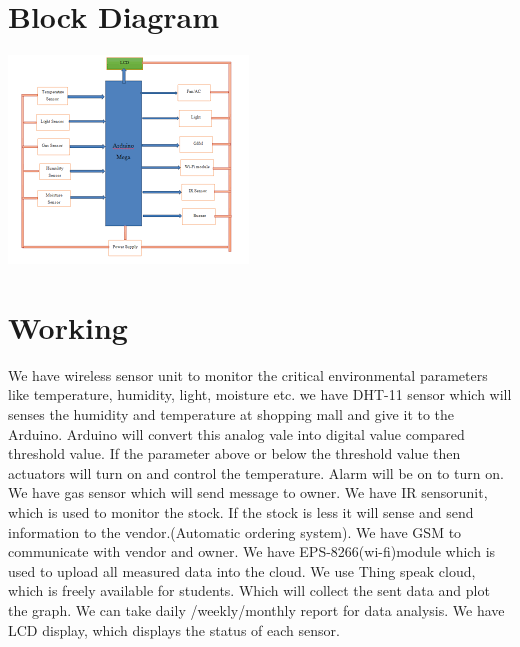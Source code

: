 \documentclass{report}
\begin{document}
\begin{multicols}{1}
    \section*{Block Diagram}
    \includegraphics{images/blockdig.png}\\
    \section*{Working}
    We have wireless sensor unit to monitor the critical environmental parameters like temperature, humidity, light, moisture etc. we have DHT-11 sensor which will senses the humidity and temperature at shopping mall and give it to the Arduino. Arduino will convert this analog vale into digital value compared threshold value. If the parameter above or below the threshold value then actuators will turn on and control the temperature. Alarm will be on to turn on. We have gas sensor which will send message to owner. We have IR sensorunit, which is used to monitor the stock. If the stock is less it will sense and send information to the vendor.(Automatic ordering system). We have GSM to communicate with vendor and owner. We have EPS-8266(wi-fi)module which is used to upload all measured data into the cloud. We use Thing speak cloud, which is freely available for students. Which will collect the sent data and plot the graph. We can take daily /weekly/monthly report for data analysis. We have LCD display, which displays the status of each sensor.

\end{multicols}
\end{document}

